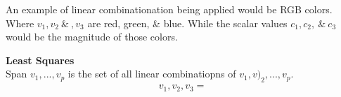 \documentclass{article}
\begin{document}
    An example of linear combinationation being applied would be RGB colors. Where $ v_{1},v_{2} ~\&~,v_{3}$ are red, green, \& blue. While the scalar values $ c_{1},c_{2}, ~\&~c_{3}$ would be the magnitude of those colors.  

   \textbf{Least Squares}\\
   Span $ {v_{1},...,v_{p}}$ is the set of all linear combinatiopns of $v_{1},v)_{2},...,v_{p}.$
   \[
     \begin{gathered}
     v_{1},v_{2},v_{3}=
     \end{gathered}
   \]
       
\end{document}
